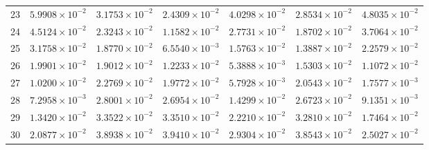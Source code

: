 \begin{table}[H]
\begin{tabular}{@{}rrrrrrr@{}}
23 & $5.9908\times10^{-2}$ & $3.1753\times10^{-2}$ & $2.4309\times10^{-2}$ & $4.0298\times10^{-2}$ & $2.8534\times10^{-2}$ & $4.8035\times10^{-2}$\\
24 & $4.5124\times10^{-2}$ & $2.3243\times10^{-2}$ & $1.1582\times10^{-2}$ & $2.7731\times10^{-2}$ & $1.8702\times10^{-2}$ & $3.7064\times10^{-2}$\\
25 & $3.1758\times10^{-2}$ & $1.8770\times10^{-2}$ & $6.5540\times10^{-3}$ & $1.5763\times10^{-2}$ & $1.3887\times10^{-2}$ & $2.2579\times10^{-2}$\\
26 & $1.9901\times10^{-2}$ & $1.9012\times10^{-2}$ & $1.2233\times10^{-2}$ & $5.3888\times10^{-3}$ & $1.5303\times10^{-2}$ & $1.1072\times10^{-2}$\\
27 & $1.0200\times10^{-2}$ & $2.2769\times10^{-2}$ & $1.9772\times10^{-2}$ & $5.7928\times10^{-3}$ & $2.0543\times10^{-2}$ & $1.7577\times10^{-3}$\\
28 & $7.2958\times10^{-3}$ & $2.8001\times10^{-2}$ & $2.6954\times10^{-2}$ & $1.4299\times10^{-2}$ & $2.6723\times10^{-2}$ & $9.1351\times10^{-3}$\\
29 & $1.3420\times10^{-2}$ & $3.3522\times10^{-2}$ & $3.3510\times10^{-2}$ & $2.2210\times10^{-2}$ & $3.2810\times10^{-2}$ & $1.7464\times10^{-2}$\\
30 & $2.0877\times10^{-2}$ & $3.8938\times10^{-2}$ & $3.9410\times10^{-2}$ & $2.9304\times10^{-2}$ & $3.8543\times10^{-2}$ & $2.5027\times10^{-2}$\\
\bottomrule
\end{tabular}
\end{table}

